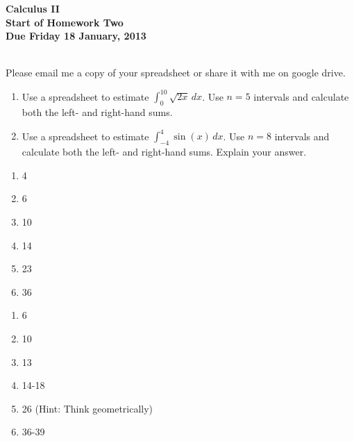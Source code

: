 \documentclass[12pt]{article}
\begin{document}
\pagestyle{empty}
 
\begin{center}
{\large {\bf Calculus II}}\\
\medskip
{\large {\bf Start of Homework Two}}\\
\medskip
{ {\bf Due Friday 18 January, 2013}}\\
\end{center}

\hspace{2mm}\\



 Please email me a copy of your
spreadsheet or share it with me on google drive. 
\begin{enumerate}
\setlength{\itemsep}{-1mm}
  \item Use a spreadsheet to estimate $\int_0^{10}\sqrt{2x} \, dx $.
    Use $n=5$ intervals and calculate both the left- and
    right-hand sums.  
  \item Use a spreadsheet to estimate $\int_{-4}^4 \sin(x) \, dx$.
    Use $n=8$ intervals and calculate both the left- and right-hand
    sums.  Explain your answer.
\end{enumerate}


\begin{enumerate}
\setlength{\itemsep}{-1mm}
  \item 4
  \item 6
  \item 10
  \item 14
  \item 23
  \item 36

\end{enumerate}




\begin{enumerate}
\setlength{\itemsep}{-1mm}
  \item 6
  \item 10
  \item 13
  \item 14-18
  \item 26 (Hint: Think geometrically)
  \item 36-39

\end{enumerate}
\end{document}
